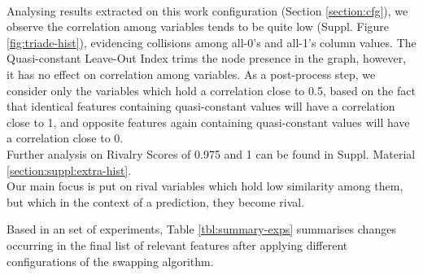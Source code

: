 \\

Analysing results extracted on this work configuration (Section \ref{section:cfg}), we observe the correlation among variables tends to be quite low (Suppl. Figure \ref{fig:triade-hist}), evidencing collisions among all-0's and all-1's column values. The Quasi-constant Leave-Out Index trims the node presence in the graph, however, it has no effect on correlation among variables. As a post-process step, we consider only the variables which hold a correlation close to 0.5, based on the fact that identical features containing quasi-constant values will have a correlation close to 1, and opposite features again containing quasi-constant values will have a correlation close to 0.
\\

Further analysis on Rivalry Scores of 0.975 and 1 can be found in Suppl. Material \ref{section:suppl:extra-hist}.
\\

Our main focus is put on rival variables which hold low similarity among them, but which in the context of a prediction, they become rival.

Based in an set of experiments, Table \ref{tbl:summary-exps} summarises changes occurring in the final list of relevant features after applying different configurations of the swapping algorithm.

